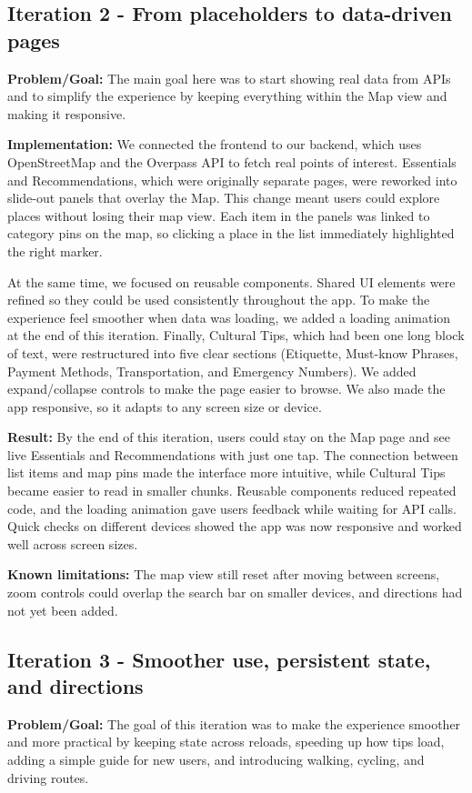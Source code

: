 \subsection{Iteration 2 - From placeholders to data-driven pages}
\textbf{Problem/Goal:} The main goal here was to start showing real data from APIs and to simplify the experience by keeping everything within the Map view and making it responsive.  

\textbf{Implementation:} We connected the frontend to our backend, which uses OpenStreetMap and the Overpass API to fetch real points of interest. Essentials and Recommendations, which were originally separate pages, were reworked into slide-out panels that overlay the Map. This change meant users could explore places without losing their map view. Each item in the panels was linked to category pins on the map, so clicking a place in the list immediately highlighted the right marker.  

At the same time, we focused on reusable components. Shared UI elements were refined so they could be used consistently throughout the app. To make the experience feel smoother when data was loading, we added a loading animation at the end of this iteration. Finally, Cultural Tips, which had been one long block of text, were restructured into five clear sections (Etiquette, Must-know Phrases, Payment Methods, Transportation, and Emergency Numbers). We added expand/collapse controls to make the page easier to browse. We also made the app responsive, so it adapts to any screen size or device.  

\textbf{Result:} By the end of this iteration, users could stay on the Map page and see live Essentials and Recommendations with just one tap. The connection between list items and map pins made the interface more intuitive, while Cultural Tips became easier to read in smaller chunks. Reusable components reduced repeated code, and the loading animation gave users feedback while waiting for API calls. Quick checks on different devices showed the app was now responsive and worked well across screen sizes.  

\textbf{Known limitations:} The map view still reset after moving between screens, zoom controls could overlap the search bar on smaller devices, and directions had not yet been added.

\subsection{Iteration 3 - Smoother use, persistent state, and directions}
\textbf{Problem/Goal:} The goal of this iteration was to make the experience smoother and more practical by keeping state across reloads, speeding up how tips load, adding a simple guide for new users, and introducing walking, cycling, and driving routes.  

